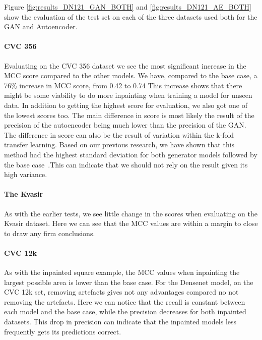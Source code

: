 %
Figure \ref{fig:results_DN121_GAN_BOTH} and \ref{fig:results_DN121_AE_BOTH} show the evaluation of the test set on each of the three datasets used both for the GAN and Autoencoder. 

\paragraph{CVC 356}
Evaluating on the CVC 356 dataset we see the most significant increase in the MCC score compared to the other models. 
We have, compared to the base case, a 76\% increase in MCC score, from 0.42 to 0.74
This increase shows that there might be some viability to do more inpainting when training a model for unseen data.
In addition to getting the highest score for evaluation, we also got one of the lowest scores too. 
The main difference in score is most likely the result of the precision of the autoencoder being much lower than the precision of the GAN.
The difference in score can also be the result of variation within the k-fold transfer learning.
Based on our previous research, we have shown that this method had the highest standard deviation for both generator models followed by the base case~\cite{Mathias2019IEEpaper}.This can indicate that we should not rely on the result given its high variance. 



\paragraph{The Kvasir}
As with the earlier tests, we see little change in the scores when evaluating on the Kvasir dataset. Here we can see that the MCC values are within a margin to close to draw any firm conclusions.



\paragraph{CVC 12k}
As with the inpainted square example, the MCC values when inpainting the largest possible area is lower than the base case.  For the Densenet model, on the CVC 12k set, removing artefacts gives not any advantages compared no not removing the artefacts. 
Here we can notice that the recall is constant between each model and the base case, while the precision decreases for both inpainted datasets. This drop in precision can indicate that the inpainted models less frequently gets its predictions correct. 


































